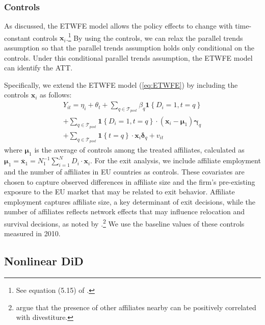 \documentclass[preprint,11pt,authoryear]{elsarticle}
\begin{document}
\subsubsection*{Controls}

As \cite{wooldridge2021two} discussed, the ETWFE model allows the policy effects to change with time-constant controls $\mathbf{x}_{i}$.\footnote{See equation (5.15) of \cite{wooldridge2021two}.}
By using the controls, we can relax the parallel trends assumption so that the parallel trends assumption holds only conditional on the controls.
Under this conditional parallel trends assumption, the ETWFE model can identify the ATT.

Specifically, we extend the ETWFE model (\ref{eq:ETWFE}) by including the controls $\mathbf{x}_{i}$ as follows:
\begin{equation} \label{eq:ETWFE2} %
\begin{array}{l}
Y_{i t}=
\eta_{i}
+
\theta_{t}
+
\sum_{q \in \mathcal{T}_{post}}
\beta_{q}
\mathbf{1}\left\{D_{i}=1, t=q\right\} \\
+
\sum_{q \in \mathcal{T}_{post}}
\mathbf{1}\left\{D_{i}=1, t=q\right\}
\cdot\left(\mathbf{x}_{i}-\boldsymbol{\mu}_{1}\right)
\boldsymbol{\gamma}_{q}
\\
+
\sum_{q \in \mathcal{T}_{post}}
\mathbf{1}\left\{t=q\right\}
\cdot \mathbf{x}_{i}
\boldsymbol{\delta}_{q}
+ v_{i t}
\end{array}
\end{equation}
where $\boldsymbol{\mu}_{1}$ is the average of controls among the treated affiliates, calculated as $\boldsymbol{\mu}_{1}=\overline{\mathbf{x}}_{1}=N_{1}^{-1} \sum_{i=1}^{N} D_{i} \cdot \mathbf{x}_{i}$.
For the exit analysis, we include affiliate employment and the number of affiliates in EU countries as controls. These covariates are chosen to capture observed differences in affiliate size and the firm's pre-existing exposure to the EU market that may be related to exit behavior.
Affiliate employment captures affiliate size, a key determinant of exit decisions, while the number of affiliates reflects network effects that may influence relocation and survival decisions, as noted by \citet{norback2015}.\footnote{\citet{norback2015} argue that the presence of other affiliates nearby can be positively correlated with divestiture.}
We use the baseline values of these controls measured in 2010.

\subsection{Nonlinear DiD}
\label{sec:method_entry}
\end{document}

